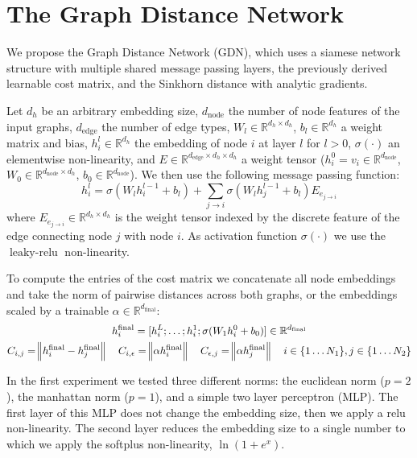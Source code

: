 \section{The Graph Distance Network}

We propose the Graph Distance Network (GDN), which uses a siamese network structure with multiple shared message passing layers, the previously derived learnable cost matrix, and the Sinkhorn distance with analytic gradients.

Let $d_h$ be an arbitrary embedding size, $d_{\text{node}}$ the number of node features of the input graphs, $d_{\text{edge}}$ the number of edge types, $W_l \in \mathbb{R}^{d_h \times d_h}$, $b_l \in   \mathbb{R}^{d_h}$ a weight matrix and bias, $h_i^l \in \mathbb{R}^{d_h}$ the embedding of node $i$ at layer $l$ for $l > 0$, $\sigma(\cdot)$ an elementwise non-linearity, and $E \in \mathbb{R}^{d_{\text{edge}} \times d_h \times d_h}$ a weight tensor ($h_i^0 = v_i \in \mathbb{R}^{d_{\text{node}}}$, $W_0 \in \mathbb{R}^{d_{\text{node}} \times d_h}$, $b_0 \in \mathbb{R}^{d_{\text{node}}}$). We then use the following message passing function:
\begin{equation}
     h_i^{l} = \sigma(W_{l} h_i^{l-1} + b_l) + \sum_{j \rightarrow i} \sigma(W_{l} h_j^{l-1} + b_l) E_{e_{j \rightarrow i}}
\end{equation}
where $E_{e_{j \rightarrow i}} \in \mathbb{R}^{d_h \times d_h}$ is the weight tensor indexed by the discrete feature of the edge connecting node $j$ with node $i$. As activation function $\sigma(\cdot)$ we use the $\operatorname{leaky-relu}$ non-linearity.

To compute the entries of the cost matrix we concatenate all node embeddings and take the norm of pairwise distances across both graphs, or the embeddings scaled by a trainable $\alpha \in \mathbb{R}^{d_\text{final}}$:
\begin{equation}
     \begin{gathered}
          h_i^\text{final} = [h_i^L ; \dots ; h_i^1 ; \sigma(W_{1} h_i^{0} + b_0)] \in \mathbb{R}^{d_\text{final}}\\
          C_{i,j} = \norm{h_i^\text{final} - h_j^\text{final}} \quad
          C_{i, \epsilon} = \norm{ \alpha h_i^\text{final}} \quad
          C_{\epsilon, j} = \norm{ \alpha h_j^\text{final}} \quad i \in \{1 \dots N_1\}, j \in \{1 \dots N_2\}
     \end{gathered}
\end{equation}

In the first experiment we tested three different norms: the euclidean norm ($p=2$), the manhattan norm ($p=1$), and a simple two layer perceptron (MLP). The first layer of this MLP does not change the embedding size, then we apply a relu non-linearity. The second layer reduces the embedding size to a single number to which we apply the softplus non-linearity, $\ln(1 + e^x)$.

